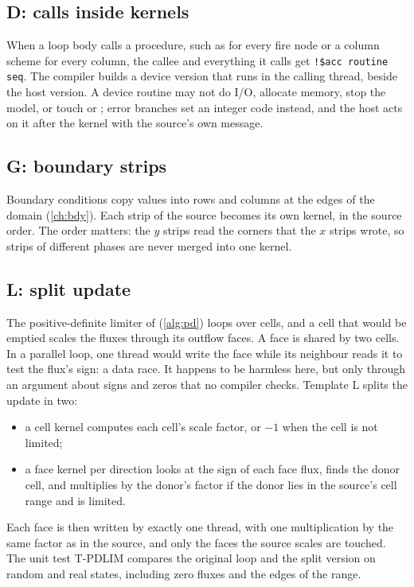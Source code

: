 \subsection{D: calls inside kernels}

When a loop body calls a procedure, such as  for every fire node or a column scheme for every column,
the callee and everything it calls get \texttt{!\$acc routine seq}. The compiler builds a device version that runs in
the calling thread, beside the host version. A device routine may not do I/O, allocate memory, stop the model, or
touch  or ; error branches set an integer code instead, and the host acts on it after
the kernel with the source's own message.

\subsection{G: boundary strips}

Boundary conditions copy values into rows and columns at the edges of the domain (\cref{ch:bdy}). Each strip of the
source becomes its own kernel, in the source order. The order matters: the $y$ strips read the corners that the $x$
strips wrote, so strips of different phases are never merged into one kernel.

\subsection{L: split update}

The positive-definite limiter of  (\cref{alg:pd}) loops over cells, and a cell that would be
emptied scales the fluxes through its outflow faces. A face is shared by two cells. In a parallel loop, one thread
would write the face while its neighbour reads it to test the flux's sign: a data race. It happens to be harmless
here, but only through an argument about signs and zeros that no compiler checks. Template L splits the update in
two:
\begin{itemize}
  \item a cell kernel computes each cell's scale factor, or $-1$ when the cell is not limited;
  \item a face kernel per direction looks at the sign of each face flux, finds the donor cell, and multiplies by the
    donor's factor if the donor lies in the source's cell range and is limited.
\end{itemize}
Each face is then written by exactly one thread, with one multiplication by the same factor as in the source, and only
the faces the source scales are touched. The unit test T-PDLIM compares the original loop and the split version on
random and real states, including zero fluxes and the edges of the range.

